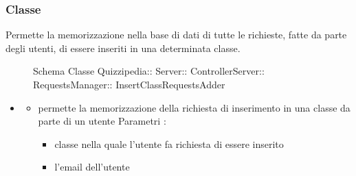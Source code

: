 \subsubsection{Classe }
Permette la memorizzazione nella base di dati di tutte le richieste, fatte da parte degli utenti, di essere inseriti in una determinata classe.
\begin{figure}[H]
\centering
\noindent{}
\caption[Schema Classe InsertClassRequestsAdder]{Schema Classe Quizzipedia:: Server:: ControllerServer:: RequestsManager:: InsertClassRequestsAdder}
\end{figure}
\begin{itemize}
\item {}
\begin{itemize}
\item {}
\newline
permette la memorizzazione della richiesta di inserimento in una classe da parte di un utente
\newline
Parametri :
\begin{itemize}
\item {}
\newline
classe nella quale l'utente fa richiesta di essere inserito
\item {}
\newline
l'email dell'utente
\end{itemize}
\end{itemize}
\end{itemize}
